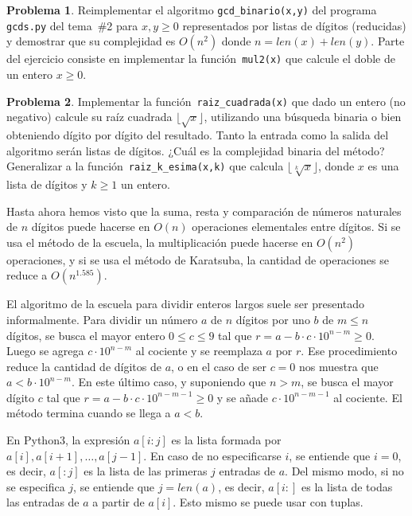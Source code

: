 \documentclass[a4paper, 11pt]{article}
\newcounter{numerodetema}
\theoremstyle{plain}
\theoremstyle{definition}
\newtheorem{prob}{Problema}[numerodetema]
\begin{document}
\begin{prob}\label{prob_gcd_2}
Reimplementar el algoritmo \texttt{gcd\_binario(x,y)} del programa \texttt{gcds.py}
del tema~\#2 para $x,y\geq 0$ representados por listas de dígitos (reducidas) y
demostrar que su complejidad es $O(n^2)$ donde $n=len(x)+len(y)$. Parte del ejercicio
consiste en implementar la función~\texttt{mul2(x)} que calcule el doble de
un entero $x\geq 0$.
\end{prob}

\begin{prob}
Implementar la función~\texttt{raiz\_cuadrada(x)} que dado un entero (no
negativo) calcule su raíz cuadrada $\lfloor\sqrt{x}\rfloor$, utilizando
una búsqueda binaria o bien obteniendo dígito por dígito del resultado.
Tanto la entrada como la salida del algoritmo serán listas de dígitos.
¿Cuál es la complejidad binaria del método? Generalizar a la
función~\texttt{raiz\_k\_esima(x,k)} que calcula $\lfloor\sqrt[k]{x}\rfloor$,
donde $x$ es una lista de dígitos y $k\geq 1$ un entero.
\end{prob}

\bigskip

Hasta ahora hemos visto que la suma, resta y comparación de números
naturales de $n$ dígitos puede hacerse en $O(n)$ operaciones elementales
entre dígitos. Si se usa el método de la escuela, la multiplicación puede
hacerse en $O(n^2)$ operaciones, y si se usa el método de Karatsuba, la
cantidad de operaciones se reduce a $O(n^{1.585})$.

\bigskip

El algoritmo de la escuela para dividir enteros largos suele ser presentado
informalmente. Para dividir un número $a$ de $n$ dígitos por uno $b$ de
$m\leq n$ dígitos, se busca el mayor entero $0\leq c\leq 9$ tal que
$r=a-b\cdot c\cdot 10^{n-m}\geq 0$. Luego se agrega $c\cdot 10^{n-m}$ al
cociente y se reemplaza $a$ por $r$. Ese procedimiento reduce la cantidad
de dígitos de $a$, o en el caso de ser $c=0$ nos muestra que $a<b\cdot 10^{n-m}$.
En este último caso, y suponiendo que $n>m$, se busca el mayor dígito $c$ tal que
$r=a-b\cdot c\cdot 10^{n-m-1}\geq 0$ y se añade $c\cdot 10^{n-m-1}$ al cociente.
El método termina cuando se llega a $a<b$.

\bigskip



\bigskip

En Python3, la expresión $a[i:j]$ es la lista formada por
$a[i],a[i+1],\ldots,a[j-1]$. En caso de no especificarse $i$, se
entiende que $i=0$, es decir, $a[:j]$ es la lista de las primeras $j$ entradas
de $a$. Del mismo modo, si no se especifica $j$, se entiende que $j=len(a)$,
es decir, $a[i:]$ es la lista de todas las entradas de $a$ a partir de $a[i]$.
Esto mismo se puede usar con tuplas.
\end{document}
